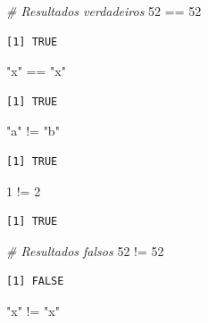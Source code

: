 \documentclass[
  brazilian,
]{book}
\newenvironment{Shaded}{\begin{snugshade}}{\end{snugshade}}
\newcommand{\CommentTok}[1]{\textcolor[rgb]{0.56,0.35,0.01}{\textit{#1}}}
\newcommand{\DecValTok}[1]{\textcolor[rgb]{0.00,0.00,0.81}{#1}}
\newcommand{\SpecialCharTok}[1]{\textcolor[rgb]{0.00,0.00,0.00}{#1}}
\newcommand{\StringTok}[1]{\textcolor[rgb]{0.31,0.60,0.02}{#1}}
\begin{document}
\begin{Shaded}
\begin{Highlighting}[]
\CommentTok{\# Resultados verdadeiros}
\DecValTok{52} \SpecialCharTok{==} \DecValTok{52}
\end{Highlighting}
\end{Shaded}

\begin{verbatim}
[1] TRUE
\end{verbatim}

\begin{Shaded}
\begin{Highlighting}[]
\StringTok{"x"} \SpecialCharTok{==} \StringTok{"x"}
\end{Highlighting}
\end{Shaded}

\begin{verbatim}
[1] TRUE
\end{verbatim}

\begin{Shaded}
\begin{Highlighting}[]
\StringTok{"a"} \SpecialCharTok{!=} \StringTok{"b"}
\end{Highlighting}
\end{Shaded}

\begin{verbatim}
[1] TRUE
\end{verbatim}

\begin{Shaded}
\begin{Highlighting}[]
\DecValTok{1} \SpecialCharTok{!=} \DecValTok{2}
\end{Highlighting}
\end{Shaded}

\begin{verbatim}
[1] TRUE
\end{verbatim}

\begin{Shaded}
\begin{Highlighting}[]
\CommentTok{\# Resultados falsos}
\DecValTok{52} \SpecialCharTok{!=} \DecValTok{52}
\end{Highlighting}
\end{Shaded}

\begin{verbatim}
[1] FALSE
\end{verbatim}

\begin{Shaded}
\begin{Highlighting}[]
\StringTok{"x"} \SpecialCharTok{!=} \StringTok{"x"}
\end{Highlighting}
\end{Shaded}
\end{document}
